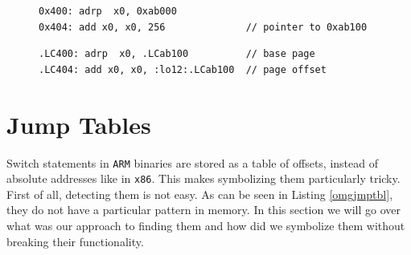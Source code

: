 \documentclass[a4paper,11pt,oneside]{report}
\begin{document}
\begin{figure}[h]
\label{lst:construction}
\begin{minipage}{\textwidth}
\begin{lstlisting}[basicstyle=\ttfamily\small]
0x400: adrp  x0, 0xab000
0x404: add x0, x0, 256              // pointer to 0xab100
\end{lstlisting}
\end{minipage}

\begin{minipage}{\textwidth}
	\begin{lstlisting}[basicstyle=\ttfamily\small]
.LC400: adrp  x0, .LCab100          // base page 
.LC404: add x0, x0, :lo12:.LCab100  // page offset
\end{lstlisting}
\end{minipage}
\end{figure}



\section{Jump Tables}

Switch statements in \texttt{ARM} binaries are stored as a table of offsets,
instead of absolute addresses like in \texttt{x86}. This makes symbolizing them
particularly tricky. First of all, detecting them is not easy. As can be seen
in Listing \ref{omgjmptbl}, they do not have a particular pattern in memory. In
this section we will go over what was our approach to finding them and how did
we symbolize them without breaking their functionality.
\end{document}
